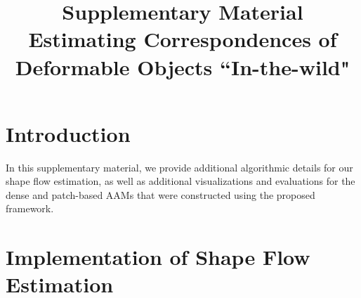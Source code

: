 






\title{Supplementary Material \\ Estimating Correspondences of Deformable Objects ``In-the-wild"}

\maketitle
\thispagestyle{empty}


\section*{Introduction}
In this supplementary material, we provide additional algorithmic details for our shape flow estimation, as well as additional visualizations and evaluations for the dense and patch-based AAMs that were constructed using the proposed framework.




\appendix
\section{Implementation of Shape Flow Estimation}
\label{sec:cost_function}

